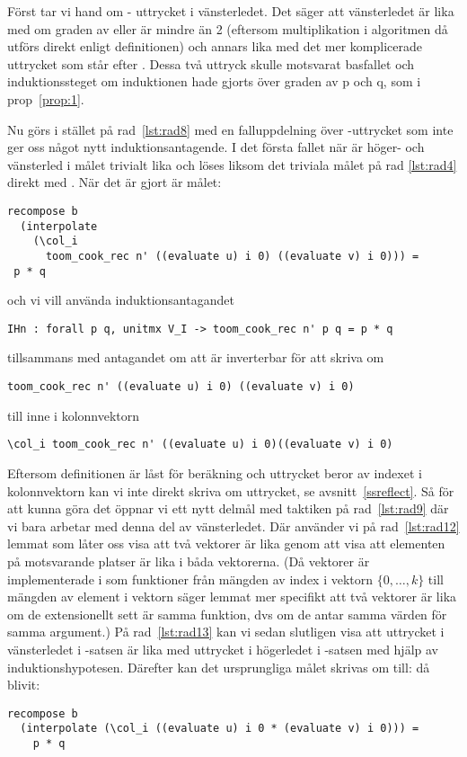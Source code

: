 Först tar vi hand om  - uttrycket i vänsterledet.
Det säger att vänsterledet är lika med  om graden
av  eller  är mindre än 2 (eftersom multiplikation i algoritmen
då utförs direkt enligt definitionen) och annars
lika med det mer komplicerade uttrycket som står efter . Dessa två
uttryck skulle motsvarat basfallet och induktionssteget om induktionen hade
gjorts över graden av p och q, som i prop~\ref{prop:1}.

Nu görs i stället på
rad~\ref{lst:rad8} med  en falluppdelning över -uttrycket
som inte ger oss något nytt induktionsantagende.
I det första fallet när  är höger- och
vänsterled i målet trivialt lika
och löses liksom det triviala målet på rad \ref{lst:rad4} direkt med \C{//}.
När det är gjort är målet:
\begin{lstlisting}
recompose b
  (interpolate
    (\col_i
      toom_cook_rec n' ((evaluate u) i 0) ((evaluate v) i 0))) =
 p * q
\end{lstlisting}
och vi vill använda induktionsantagandet
\begin{lstlisting}
IHn : forall p q, unitmx V_I -> toom_cook_rec n' p q = p * q
\end{lstlisting}
tillsammans med antagandet  om att  är inverterbar för att
skriva om
\begin{lstlisting}
toom_cook_rec n' ((evaluate u) i 0) ((evaluate v) i 0)
\end{lstlisting}
till  inne i kolonnvektorn
\begin{lstlisting}
\col_i toom_cook_rec n' ((evaluate u) i 0)((evaluate v) i 0)
\end{lstlisting}
Eftersom definitionen  är låst för beräkning och uttrycket beror av
indexet  i kolonnvektorn kan vi inte direkt skriva om uttrycket, se
avsnitt~\ref{ssreflect}. Så för att kunna göra det öppnar vi ett nytt delmål
med taktiken  på rad~\ref{lst:rad9} där vi bara arbetar med denna del av
vänsterledet. Där använder vi på rad~\ref{lst:rad12} lemmat  som låter oss visa
att två vektorer är lika genom att visa att elementen på motsvarande platser är
lika i båda vektorerna. (Då vektorer är implementerade i \ssr{} som funktioner
från mängden av index i vektorn $\{0, \ldots , k\}$ till mängden av element i
vektorn säger lemmat mer specifikt att två vektorer är lika om de extensionellt
sett är samma funktion, dvs om de antar samma värden för samma argument.) På
rad~\ref{lst:rad13} kan vi sedan slutligen visa att uttrycket i vänsterledet i
-satsen är lika med uttrycket i högerledet i -satsen med hjälp
av induktionshypotesen. Därefter kan det ursprungliga målet skrivas om till: då
blivit:
\begin{lstlisting}
recompose b
  (interpolate (\col_i ((evaluate u) i 0 * (evaluate v) i 0))) =
    p * q
\end{lstlisting}


